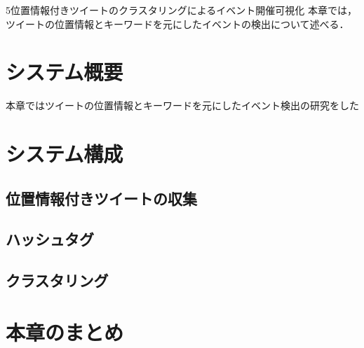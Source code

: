 \chapterhead
{5}{位置情報付きツイートのクラスタリングによるイベント開催可視化}
{本章では，ツイートの位置情報とキーワードを元にしたイベントの検出について述べる．}


\section{システム概要}
本章ではツイートの位置情報とキーワードを元にしたイベント検出の研究をした

\section{システム構成}
\subsection{位置情報付きツイートの収集}
\subsection{ハッシュタグ}
\subsection{クラスタリング}

\newpage

\section{本章のまとめ}

\newpage
